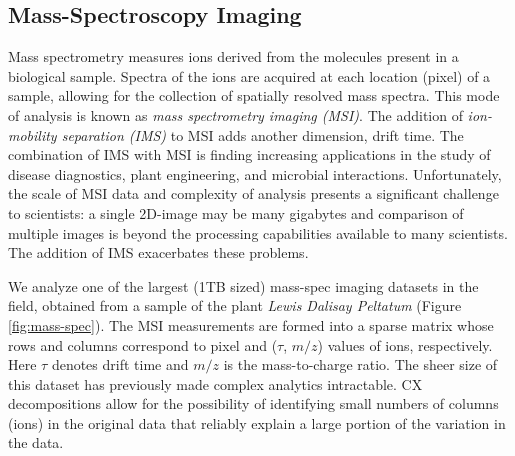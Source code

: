 \subsection{Mass-Spectroscopy Imaging}
Mass spectrometry measures ions derived from the molecules present in a biological sample. Spectra of the ions are acquired at each location (pixel) of a sample, allowing for the collection of spatially resolved mass spectra. This mode of analysis is known as \textit{mass spectrometry imaging (MSI)}. The addition of \textit{ion-mobility separation (IMS)} to MSI adds another dimension, drift time.  The combination of IMS with MSI is finding increasing applications in the study of disease diagnostics, plant engineering, and microbial interactions. Unfortunately, the scale of MSI data and complexity of analysis presents a significant challenge to scientists: a single 2D-image may be many gigabytes and comparison of multiple images is beyond the processing capabilities available to many scientists. The addition of IMS exacerbates these problems. 

We analyze one of the largest (1TB sized) mass-spec imaging datasets in the field, obtained from a sample of the plant {\it Lewis Dalisay Peltatum} (Figure \ref{fig:mass-spec}). The MSI measurements are formed into a sparse matrix whose rows and columns correspond to pixel and ($\tau$, $m/z$) values of ions, respectively. Here $\tau$ denotes drift time and $m/z$ is the mass-to-charge ratio. The sheer size of this dataset has previously made complex analytics intractable. CX decompositions allow for the possibility of identifying small numbers of columns (ions) in the original data that reliably explain a large portion of the variation in the data.


